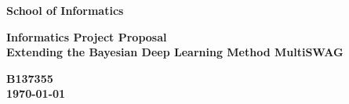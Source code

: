 \documentclass[a4paper,11pt]{article}
\newcommand{\examnumber}{B137355}
\newcommand{\field}{Extending the Bayesian Deep Learning Method MultiSWAG}
\begin{document}
\begin{minipage}[b]{110mm}
        {\Huge\bf School of Informatics
        \vspace*{17mm}}
\end{minipage}
\hfill
\begin{minipage}[t]{40mm}               
\end{minipage}
\par\noindent
\vspace*{2cm}
\begin{center}
        \Large\bf Informatics Project Proposal \\
        \Large\bf \field
\end{center}
\vspace*{1.5cm}
\begin{center}
        \bf \examnumber\\
        \monthyeardate\today
\end{center}
\vspace*{5mm}

%
%                       
\begin{abstract}
The aim of this project is to improve the accuracy and calibration of the Bayesian deep learning method MultiSWAG, which approximates the posterior distribution of the parameters of a deep neural network with a mixture of Gaussians. This will be achieved by replacing the mixture of Gaussians with a mixture of factor analysis models. An online version of factor analysis will be implemented to ensure that the proposed method scales to deep neural networks with millions of parameters. The new approach will be compared to MultiSWAG through a series of experiments involving linear models, Gaussian processes and deep neural networks. 
\end{abstract}

\vspace*{1cm}
\end{document}
